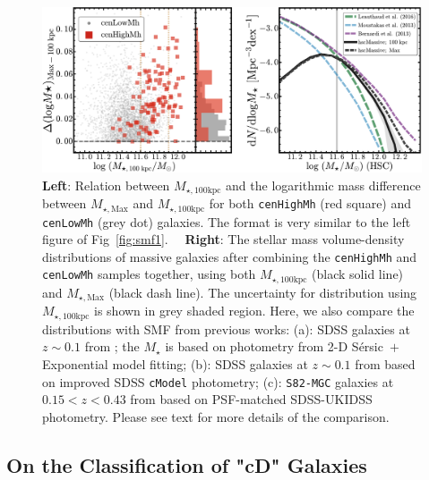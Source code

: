 \documentclass{emulateapj}
\def\ser{{S\'{e}rsic\ }}
\def\rbcg{\texttt{cenHighMh}}
\def\nbcg{\texttt{cenLowMh}}
\def\mstar{{$M_{\star}$}}
\def\mtot{{$M_{\star,100\mathrm{kpc}}$}}
\def\mmax{{$M_{\star,\mathrm{Max}}$}}
\begin{document}
\begin{CJK*}{UTF8}{gbsn}
  \begin{figure}[t]
      \centering 
      \includegraphics[width=\textwidth]{fig/redbcg_discussion_5}
      \caption{
          \textbf{Left}: Relation between \mtot{} and the logarithmic mass difference 
          between \mmax{} and \mtot{} for both \rbcg{} (red square) and \nbcg{} 
          (grey dot) galaxies.  The format is very similar to the left figure of 
          Fig~\ref{fig:smf1}.~~
          \textbf{Right}: The stellar mass volume-density distributions of massive galaxies 
          after combining the \rbcg{} and \nbcg{} samples together, using both 
          \mtot{} (black solid line) and \mmax{} (black dash line). 
          The uncertainty for distribution using \mtot{} is shown in grey shaded region.  
          Here, we also compare the distributions with SMF from previous works: 
          (a): SDSS galaxies at $z\sim 0.1$ from \citet{Bernardi2013}; the \mstar{} is 
          based on photometry from 2-D \ser{}$+$Exponential model fitting; 
          (b): SDSS galaxies at $z\sim 0.1$ from \citet{Moustakas13} based on 
          improved SDSS \texttt{cModel} photometry; 
          (c): \texttt{S82-MGC} galaxies at $0.15 < z< 0.43$ from 
          \citet{Leauthaud2016} based on PSF-matched SDSS-UKIDSS photometry.
          Please see text for more details of the comparison.
          }
      \label{fig:discussion_2}
  \end{figure}

    
\subsection{On the Classification of "cD" Galaxies}
        

\end{CJK*}
\end{document}

